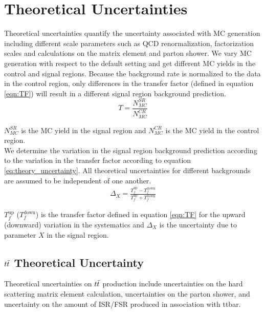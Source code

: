 
\section{Theoretical Uncertainties}
\label{sec:TheoSystematics}

\indent Theoretical uncertainties quantify the uncertainty associated with MC generation including different scale parameters such as QCD renormalization, factorization scales and calculations on the matrix element and parton shower.  We vary MC generation with respect to the default setting and get different MC yields in the control and signal regions.  Because the background rate is normalized to the data in the control region, only differences in the transfer factor (defined in equation \ref{eqn:TF}) will result in a different signal region background prediction.    \\

\begin{equation}
T = \frac{N_{MC}^{SR}}{N_{MC}^{CR}}
\label{eqn:TF}
\end{equation}

\indent $N_{MC}^{SR}$ is the MC yield in the signal region and $N_{MC}^{CR}$ is the MC yield in the control region. \\

\indent  We determine the variation in the signal region background prediction according to the variation in the transfer factor according to equation \ref{eq:theory_uncertainty}.   All theoretical uncertainties for different backgrounds are assumed to be independent of one another.  \\

 \begin{eqnarray}
    \Delta_{X} = \frac{T_f^{\mathrm{up}} - T_f^{\mathrm{down}}}{T_f^{\mathrm{up}} + T_f^{\mathrm{down}}}
    \label{eq:theory_uncertainty}
  \end{eqnarray}

\indent $T_f^{\mathrm{up}}$ ($T_f^{\mathrm{down}}$) is the transfer factor defined in equation \ref{eqn:TF} for the upward (downward) variation in the systematics and $\Delta_{X}$ is the uncertainty due to parameter $X$ in the signal region.  \\

\subsection{$t\bar{t}$ Theoretical Uncertainty}
\label{sec:systTheo:ttbar}

\indent Theoretical uncertainties on $t\bar{t}$ production include uncertainties on the hard scattering matrix element calculation, uncertainties on the parton shower, and uncertainty on the amount of ISR/FSR produced in association with ttbar.  \\

